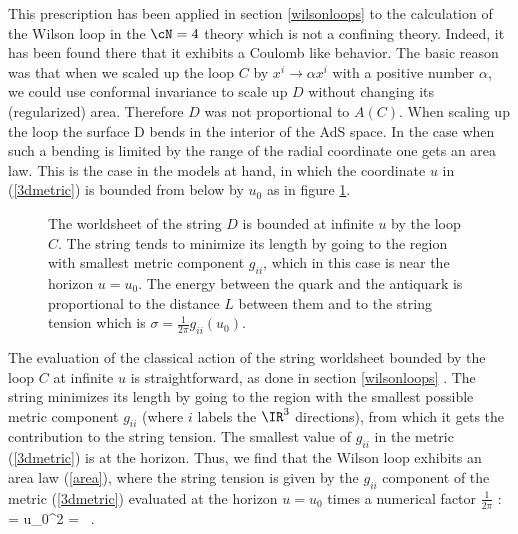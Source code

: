 This prescription has been applied in section \ref{wilsonloops} 
to the calculation of the
Wilson loop in the $\cN=4$ theory which is not a confining theory. 
Indeed, it has been
found there that it exhibits a Coulomb like behavior.
The basic reason was that when we scaled up the loop $C$ by 
$x^i \rightarrow \alpha x^i$ with a positive number $\alpha$, 
we could use conformal invariance to 
scale up $D$ without changing its (regularized) area. 
Therefore $D$ was not proportional
to $A(C)$.
When scaling up the loop the surface D bends in the interior of the AdS space. 
In the case when such a bending is limited by the range of the radial 
coordinate
one gets an area law. This is the case in the models at hand, in which
the coordinate $u$ in (\ref{3dmetric}) 
is bounded from below by $u_0$ as in figure \ref{string_fig}.

\begin{figure}[htb]
\begin{center}
\epsfxsize=3in\leavevmode{}
\end{center}
\caption{The worldsheet of the string $D$ is bounded at infinite $u$ by the 
loop $C$. The string tends to minimize its length by going to the 
region with smallest
metric component $g_{ii}$, which in this case 
is near the horizon $u=u_0$. The energy between the quark and the antiquark
is proportional to the distance $L$ between them and to the string tension
which is $\sigma = \frac{1}{2\pi}g_{ii}(u_0)$.
}
\label{string_fig}
\end{figure} 

The evaluation of the classical action of the string worldsheet 
bounded by the loop $C$ at infinite $u$ is straightforward, 
as done in section \ref{wilsonloops}
\cite{Rey:1998wp,Brandhuber:1998wl}.
The string minimizes its length by going to the region with the
smallest possible metric component $g_{ii}$ (where $i$ labels the
$\IR^3$ directions), from which it gets the contribution to the string
tension.  The smallest value of $g_{ii}$ in the metric
(\ref{3dmetric}) is at the horizon.  Thus, we find that the Wilson
loop exhibits an area law (\ref{area}), where the string tension is
given by the $g_{ii}$ component of the metric (\ref{3dmetric})
evaluated at the horizon $u=u_0$ times a numerical factor
$\frac{1}{2\pi}$ :
\beq
\sigma =   u_0^2 = 
 \ .
\label{tension}
\eeq


